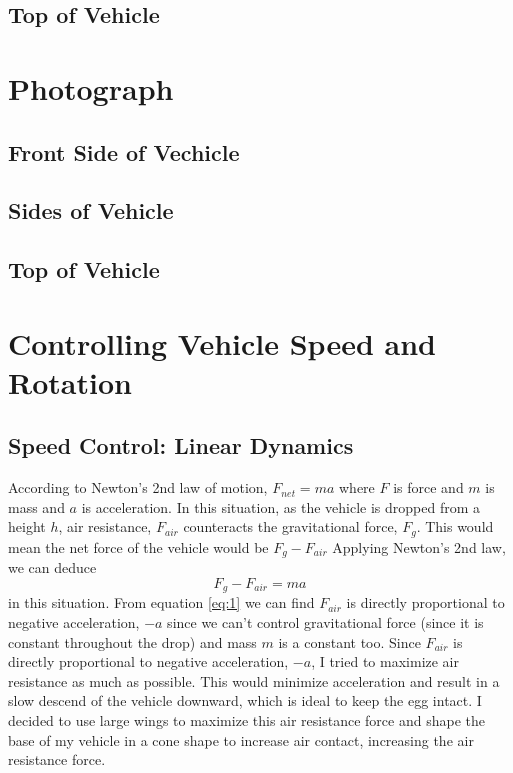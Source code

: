\documentclass[12pt]{report}
\begin{document}
\section{Top of Vehicle}


\chapter{Photograph}
\section{Front Side of Vechicle}
\section{Sides of Vehicle}
\section{Top of Vehicle}



\chapter{Controlling Vehicle Speed and Rotation}



\section{Speed Control: Linear Dynamics}

\qquad According to Newton's 2nd law of motion, $F_{net} = ma$ where $F$ is force and $m$ is mass and $a$ is acceleration. In this situation, as the vehicle is dropped from a height $h$, air resistance, $ F_{air} $ counteracts the gravitational force, $ F_{g} $. This would mean the net force of the vehicle would be $F_{g} - F_{air}$
Applying Newton's 2nd law, we can deduce
\begin{equation} \label{eq:1}
F_{g} - F_{air} = ma
\end{equation}
 in this situation. From equation \ref{eq:1} we can find $F_{air}$ is directly proportional to negative acceleration, $-a$ since we can't control gravitational force (since it is constant throughout the drop) and mass $m$ is a constant too.
 Since $F_{air}$ is directly proportional to negative acceleration, $-a$, I tried to maximize air resistance as much as possible. This would minimize acceleration and result in a slow descend of the vehicle downward, which is ideal to keep the egg intact. I decided to use large wings to maximize this air resistance force and shape the base of my vehicle in a cone shape to increase air contact, increasing the air resistance force.
\end{document}
